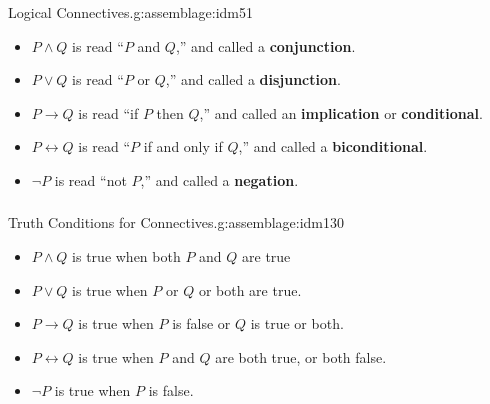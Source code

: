 \documentclass[11pt, compress]{beamer}
\newcommand{\terminology}[1]{\textbf{#1}}\newcommand{\lt}{<}
\renewcommand{\iff}{\leftrightarrow}
\newcommand{\imp}{\rightarrow}
\begin{document}
\begin{frame}
\frametitle{}
\begin{assemblage}{Logical Connectives.}{g:assemblage:idm51}%

\begin{itemize}
\item{}\(P \wedge Q\) is read ``\(P\) and \(Q\),'' and called a \terminology{conjunction}. \label{g:notation:idm66}

\item{}\(P \vee Q\) is read ``\(P\) or \(Q\),'' and called a \terminology{disjunction}. \label{g:notation:idm81}

\item{}\(P \imp Q\) is read ``if \(P\) then \(Q\),'' and called an \terminology{implication} or \terminology{conditional}. 

\item{}\(P \iff Q\) is read ``\(P\) if and only if \(Q\),'' and called a \terminology{biconditional}. 

\item{}\(\neg P\) is read ``not \(P\),'' and called a \terminology{negation}. \label{g:notation:idm126}
\end{itemize}\end{assemblage}
\end{frame}
 
\begin{frame}
\frametitle{}
\begin{assemblage}{Truth Conditions for Connectives.}{g:assemblage:idm130}%

\begin{itemize}
\item{}\(P \wedge Q\) is true when both \(P\) and \(Q\) are true

\item{}\(P \vee Q\) is true when \(P\) or \(Q\) or both are true.

\item{}\(P \imp Q\) is true when \(P\) is false or \(Q\) is true or both.

\item{}\(P \iff Q\) is true when \(P\) and \(Q\) are both true, or both false.

\item{}\(\neg P\) is true when \(P\) is false.
\end{itemize}\end{assemblage}
\end{frame}
 
\end{document}
